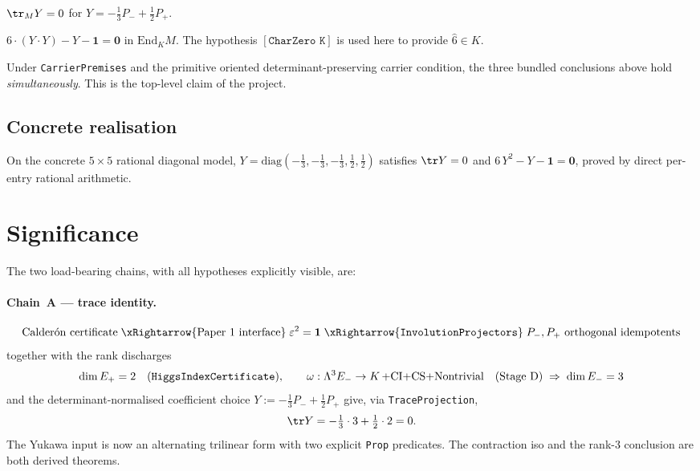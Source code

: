 \begin{theorem}
$\tr_M Y = 0$ for $Y = -\tfrac13 P_- + \tfrac12 P_+$.
\end{theorem}

\begin{theorem}
$6\cdot(Y\cdot Y) - Y - \mathbf 1 = \mathbf 0$ in $\mathrm{End}_K M$.
The hypothesis $[\texttt{CharZero K}]$ is used here to provide
$\widehat 6 \in K$.
\end{theorem}

\begin{theorem}
Under \texttt{CarrierPremises} and the primitive oriented
determinant-preserving carrier condition, the three bundled
conclusions above hold \emph{simultaneously}. This is the
top-level claim of the project.
\end{theorem}

\subsection*{Concrete realisation}

\begin{theorem}
On the concrete $5\times 5$ rational diagonal model,
$Y = \mathrm{diag}(-\tfrac13,-\tfrac13,-\tfrac13,\tfrac12,\tfrac12)$
satisfies $\tr Y = 0$ and $6\,Y^2 - Y - \mathbf 1 = \mathbf 0$,
proved by direct per-entry rational arithmetic.
\end{theorem}

\section{Significance}
\label{sec:significance}

The two load-bearing chains, with all hypotheses explicitly
visible, are:

\paragraph{Chain~A --- trace identity.}
\[
\text{Calderón certificate}
\;\xRightarrow{\text{Paper 1 interface}}\;
\varepsilon^2 = \mathbf 1
\;\xRightarrow{\text{\texttt{InvolutionProjectors}}}\;
P_-, P_+ \text{ orthogonal idempotents}
\]
together with the rank discharges
\[
\dim E_+ = 2 \quad (\text{\texttt{HiggsIndexCertificate}}),
\qquad
\omega : \Lambda^3 E_- \to K\,\text{+CI+CS+Nontrivial} \quad (\text{Stage D})
\;\Rightarrow\;
\dim E_- = 3
\]
and the determinant-normalised coefficient choice
$Y := -\tfrac13 P_- + \tfrac12 P_+$ give, via
\texttt{TraceProjection},
\[
\tr Y = -\tfrac13 \cdot 3 + \tfrac12 \cdot 2 = 0.
\]
The Yukawa input is now an alternating trilinear form with two
explicit \texttt{Prop} predicates. The contraction iso and the
rank-3 conclusion are both derived theorems.

